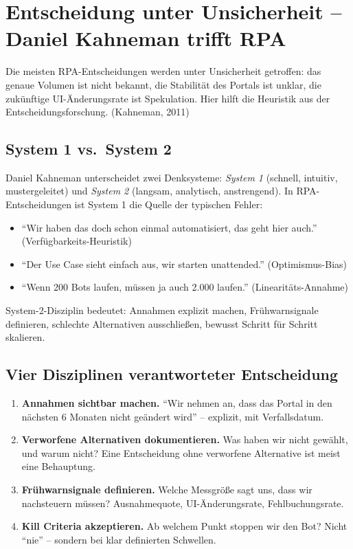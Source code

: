 \documentclass[11pt,a4paper,oneside]{article}
\newcommand{\quelle}[1]{{\footnotesize\color{lpGray}(#1)}}
\begin{document}
\section{Entscheidung unter Unsicherheit -- Daniel Kahneman trifft RPA}

Die meisten RPA-Entscheidungen werden unter Unsicherheit getroffen: das genaue Volumen ist nicht bekannt, die Stabilität des Portals ist unklar, die zukünftige UI-Änderungsrate ist Spekulation. Hier hilft die Heuristik aus der Entscheidungsforschung. \quelle{Kahneman, 2011}

\subsection{System 1 vs.\ System 2}

Daniel Kahneman unterscheidet zwei Denksysteme: \emph{System 1} (schnell, intuitiv, mustergeleitet) und \emph{System 2} (langsam, analytisch, anstrengend). In RPA-Entscheidungen ist System 1 die Quelle der typischen Fehler:

\begin{itemize}
  \item ``Wir haben das doch schon einmal automatisiert, das geht hier auch.'' (Verfügbarkeits-Heuristik)
  \item ``Der Use Case sieht einfach aus, wir starten unattended.'' (Optimismus-Bias)
  \item ``Wenn 200 Bots laufen, müssen ja auch 2.000 laufen.'' (Linearitäts-Annahme)
\end{itemize}

System-2-Disziplin bedeutet: Annahmen explizit machen, Frühwarnsignale definieren, schlechte Alternativen ausschließen, bewusst Schritt für Schritt skalieren.

\subsection{Vier Disziplinen verantworteter Entscheidung}

\begin{enumerate}
  \item \textbf{Annahmen sichtbar machen.} ``Wir nehmen an, dass das Portal in den nächsten 6 Monaten nicht geändert wird'' -- explizit, mit Verfallsdatum.
  \item \textbf{Verworfene Alternativen dokumentieren.} Was haben wir nicht gewählt, und warum nicht? Eine Entscheidung ohne verworfene Alternative ist meist eine Behauptung.
  \item \textbf{Frühwarnsignale definieren.} Welche Messgröße sagt uns, dass wir nachsteuern müssen? Ausnahmequote, UI-Änderungsrate, Fehlbuchungsrate.
  \item \textbf{Kill Criteria akzeptieren.} Ab welchem Punkt stoppen wir den Bot? Nicht ``nie'' -- sondern bei klar definierten Schwellen.
\end{enumerate}
\end{document}
